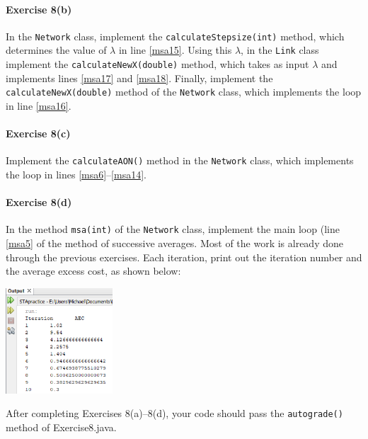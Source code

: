 \documentclass[12pt]{article}
\begin{document}
\paragraph*{Exercise 8(b)} In the \texttt{Network} class, implement the \texttt{calculateStepsize(int)} method, which determines the value of $\lambda$ in line \ref{msa15}. Using this $\lambda$, in the \texttt{Link} class implement the \texttt{calculateNewX(double)} method, which takes as input $\lambda$ and implements lines \ref{msa17} and \ref{msa18}. 
Finally, implement the \texttt{calculateNewX(double)} method of the \texttt{Network} class, which implements the loop in line \ref{msa16}. 



\paragraph*{Exercise 8(c)} Implement the \texttt{calculateAON()} method in the \texttt{Network} class, which implements the loop in lines \ref{msa6}--\ref{msa14}. 

\paragraph*{Exercise 8(d)} In the method \texttt{msa(int)} of the \texttt{Network} class, implement the main loop (line \ref{msa5} of the method of successive averages. Most of the work is already done through the previous exercises. Each iteration, print out the iteration number and the average excess cost, as shown below:

\begin{center}
	\includegraphics[width=0.3\textwidth]{netbeans8.png}
\end{center}








	

	
	\noindent
	After completing Exercises 8(a)--8(d), your code should pass the \texttt{autograde()} method of Exercise8.java. 
	
\end{document}
